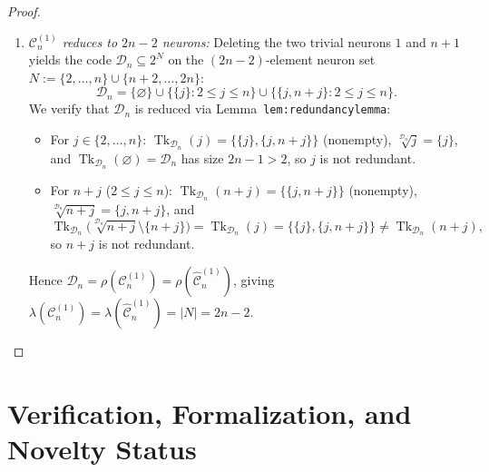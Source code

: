 \documentclass[11pt]{article}
\theoremstyle{plain}
\theoremstyle{definition}
\theoremstyle{remark}
\DeclareMathOperator{\Tk}{Tk}
\begin{document}
\begin{proof}
\begin{enumerate}[label=\textup{(\roman*)}]
\item \emph{$\mathcal{C}_n^{(1)}$ reduces to $2n - 2$ neurons:}
Deleting the two trivial neurons $1$ and $n+1$ yields the code $\mathcal{D}_n \subseteq 2^N$ on the $(2n - 2)$-element neuron set $N := \{2, \dots, n\} \cup \{n+2, \dots, 2n\}$:
\[
\mathcal{D}_n = \{\varnothing\} \cup \bigl\{\{j\} : 2 \le j \le n\bigr\} \cup \bigl\{\{j, n+j\} : 2 \le j \le n\bigr\}.
\]
We verify that $\mathcal{D}_n$ is reduced via Lemma~\texttt{lem:redundancylemma}:
\begin{itemize}[leftmargin=1.5em]
\item For $j \in \{2, \dots, n\}$: $\Tk_{\mathcal{D}_n}(j) = \{\{j\}, \{j, n+j\}\}$ (nonempty), $\sqrt[\mathcal{D}_n]{j} = \{j\}$, and $\Tk_{\mathcal{D}_n}(\varnothing) = \mathcal{D}_n$ has size $2n - 1 > 2$, so $j$ is not redundant.
\item For $n + j$ ($2 \le j \le n$): $\Tk_{\mathcal{D}_n}(n+j) = \{\{j, n+j\}\}$ (nonempty), $\sqrt[\mathcal{D}_n]{n+j} = \{j, n+j\}$, and
\[
\Tk_{\mathcal{D}_n}\bigl(\sqrt[\mathcal{D}_n]{n+j} \setminus \{n+j\}\bigr) = \Tk_{\mathcal{D}_n}(j) = \{\{j\}, \{j, n+j\}\} \neq \Tk_{\mathcal{D}_n}(n+j),
\]
so $n + j$ is not redundant.
\end{itemize}
Hence $\mathcal{D}_n = \rho(\mathcal{C}_n^{(1)}) = \rho(\widehat{\mathcal{C}}_n^{(1)})$, giving $\lambda(\mathcal{C}_n^{(1)}) = \lambda(\widehat{\mathcal{C}}_n^{(1)}) = |N| = 2n - 2$. \qedhere
\end{enumerate}
\end{proof}

\section{Verification, Formalization, and Novelty Status}
\end{document}
